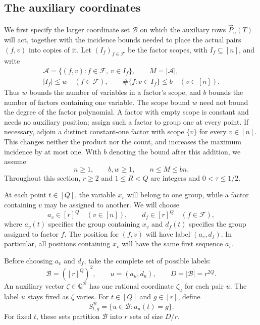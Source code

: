 \documentclass[11pt,reqno]{amsart}
\numberwithin{equation}{section}
\theoremstyle{definition}\newtheorem{definition}[theorem]{Definition}
\theoremstyle{remark}\newtheorem{remark}[theorem]{Remark}
\renewcommand{\le}{\leqslant}
\renewcommand{\ge}{\geqslant}
\begin{document}
\subsection{The auxiliary coordinates}\label{subsec:incidence-layout}
We first specify the larger coordinate set $\mathcal B$ on which
the auxiliary rows $\vec{P}_u(T)$ will act, together with the incidence
bounds needed to place the actual pairs $(f,v)$ into copies of it.
Let $(I_f)_{f\in\mathcal F}$ be the factor scopes, with $I_f\subseteq[n]$,
and write
\begin{equation}\label{eq:factor-incidences}
 \begin{gathered}
 \mathcal A=\{(f,v):f\in\mathcal F,\ v\in I_f\},\qquad M=|\mathcal A|,\\
 |I_f|\le w\quad(f\in\mathcal F),\qquad
 \#\{f:v\in I_f\}\le b\quad(v\in[n]).
 \end{gathered}
\end{equation}
Thus $w$ bounds the number of variables in a factor's scope, and $b$
bounds the number of factors containing one variable. The scope bound
$w$ need not bound the degree of the factor polynomial. A factor with
empty scope is constant and needs no auxiliary position; assign such
a factor to group one at every point. If necessary, adjoin a distinct
constant-one factor with scope $\{v\}$ for every $v\in[n]$. This changes
neither the product nor the count, and increases the maximum incidence
by at most one. With $b$ denoting the bound after this addition, we assume
\[
 n\ge1,\qquad b,w\ge1,\qquad n\le M\le bn.
\]
Throughout this section, $r\ge2$ and $1\le R<Q$ are integers and
$0<\tau\le1/2$.

At each point $t\in[Q]$, the variable $x_v$ will belong to one group,
while a factor containing $v$ may be assigned to another. We will choose
\[
 a_v\in[r]^Q\quad(v\in[n]),\qquad
 d_f\in[r]^Q\quad(f\in\mathcal F),
\]
where $a_v(t)$ specifies the group containing $x_v$ and $d_f(t)$
specifies the group assigned to factor $f$. The position for $(f,v)$
will have label $(a_v,d_f)$. In particular, all positions containing
$x_v$ will have the same first sequence $a_v$.

Before choosing $a_v$ and $d_f$, take the complete set of possible labels:
\begin{equation}\label{eq:auxiliary-labels}
 \mathcal B=([r]^Q)^2,\qquad u=(a_u,d_u),\qquad D=|\mathcal B|=r^{2Q}.
\end{equation}
An auxiliary vector $\zeta\in\mathbb Q^{\mathcal B}$ has one rational
coordinate $\zeta_u$ for each pair $u$. The label $u$ stays fixed as
$\zeta$ varies. For $t\in[Q]$ and $g\in[r]$, define
\begin{equation}\label{eq:auxiliary-groups}
 S^{\mathcal B}_{t,g}=\{u\in\mathcal B:a_u(t)=g\}.
\end{equation}
For fixed $t$, these sets partition $\mathcal B$ into $r$ sets of size
$D/r$.
\end{document}
